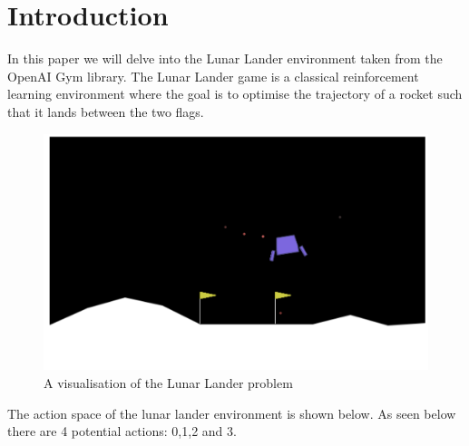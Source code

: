 \documentclass{article}
\begin{document}

\begin{abstract}

\end{abstract}

\section {Introduction}
In this paper we will delve into the Lunar Lander environment taken from the OpenAI Gym library. The Lunar Lander game is a classical reinforcement learning environment where the goal is to optimise the trajectory of a rocket such that it lands between the two flags. 

\begin{figure}[htbp]
\centering
\includegraphics[width=0.6\linewidth]{Report/images/visualisation.png}
\caption{\label{fig:Visualization of the Cart-pole} A visualisation of the Lunar Lander problem}
\end{figure}



The action space of the lunar lander environment is shown below. 
As seen below there are 4 potential actions: 0,1,2 and 3. 
\end{document}

